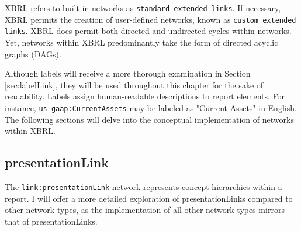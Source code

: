 XBRL refers to built-in networks as \texttt{standard extended links}.
If necessary, XBRL permits the creation of user-defined networks, known as \texttt{custom extended links}\cite{xbrl21_terminology}.
XBRL does permit both directed and undirected cycles within networks.
Yet, networks within XBRL predominantly take the form of directed acyclic graphs (DAGs).

Although labels will receive a more thorough examination in Section \ref{sec:labelLink}, they will be used throughout this chapter for the sake of readability.
Labels assign human-readable descriptions to report elements. For instance, \texttt{us-gaap:CurrentAssets} may be labeled as "Current Assets" in English.
The following sections will delve into the conceptual implementation of networks within XBRL.


\subsection{presentationLink}



The \texttt{link:presentationLink} network represents concept hierarchies within a report.
I will offer a more detailed exploration of presentationLinks compared to other network types,
as the implementation of all other network types mirrors that of presentationLinks.

